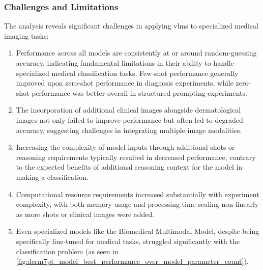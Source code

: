 \documentclass[../ShajiS_RnDReport.tex]{subfiles}
\begin{document}
\subsubsection{Challenges and Limitations}
The analysis reveals significant challenges in applying \glspl{vlm} to specialized medical imaging tasks:
\begin{enumerate}[label=\alph*)]
    \item Performance across all models are consistently at or around random-guessing accuracy, indicating fundamental limitations in their ability to handle specialized medical classification tasks. Few-shot performance generally improved upon zero-shot performance in diagnosis experiments, while zero-shot performance was better overall in structured prompting experiments.
    
    \item The incorporation of additional clinical images alongside dermatological images not only failed to improve performance but often led to degraded accuracy, suggesting challenges in integrating multiple image modalities.
    
    \item Increasing the complexity of model inputs through additional shots or reasoning requirements typically resulted in decreased performance, contrary to the expected benefits of additional reasoning context for the model in making a classification.
    
    \item Computational resource requirements increased substantially with experiment complexity, with both memory usage and processing time scaling non-linearly as more shots or clinical images were added.
    
    \item Even specialized models like the Biomedical Multimodal Model, despite being specifically fine-tuned for medical tasks, struggled significantly with the classification problem (as seen in \autoref{fig:derm7pt_model_best_performance_over_model_parameter_count}).
\end{enumerate}
\end{document}
